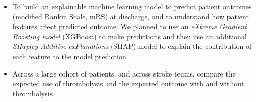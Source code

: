 \begin{itemize}
    \item To build an explainable machine learning model to predict patient outcomes (modified Rankin Scale, mRS) at discharge, and to understand how patient features affect predicted outcome. We planned to use an \emph{eXtreme Gradient Boosting model \cite{chen_xgboost_2016}} (XGBoost) to make predictions and then use an additional \emph{SHapley Additive exPlanations} \cite{lundberg_unified_2017} (SHAP) model to explain the contribution of each feature to the model prediction.

    \item Across a large cohort of patients, and across stroke teams, compare the expected use of thrombolysis and the expected outcome with and without thrombolysis.
    
\end{itemize}
